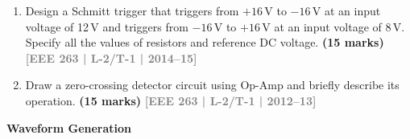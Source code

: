 \documentclass[12pt,a3paper]{article}
\newcommand{\yr}[1]{\hfill\textcolor{gray}{\small\textbf{[#1]}}}
\newcommand{\mk}[1]{\textcolor{orange!70!black}{\small\textbf{(#1 marks)}}}
\newcommand{\subtopic}[2]{%
  \vspace{10pt}
  \noindent\begin{tcolorbox}[colback=#1!8,colframe=#1,boxrule=0.6pt,arc=4pt,
    left=6pt,right=6pt,top=4pt,bottom=4pt]
    \small\bfseries\textcolor{#1}{#2}
  \end{tcolorbox}
  \vspace{2pt}
}
\begin{document}
\begin{enumerate}
\begin{center}
\end{center}
\mk{11} \yr{EEE 263 | L-2/T-1 | 2016--17}

\item Design a Schmitt trigger that triggers from $+16\,\text{V}$ to $-16\,\text{V}$ at an input voltage of 12\,V and triggers from $-16\,\text{V}$ to $+16\,\text{V}$ at an input voltage of 8\,V. Specify all the values of resistors and reference DC voltage.
\mk{15} \yr{EEE 263 | L-2/T-1 | 2014--15}

\item Draw a zero-crossing detector circuit using Op-Amp and briefly describe its operation.
\mk{15} \yr{EEE 263 | L-2/T-1 | 2012--13}

\end{enumerate}

\subtopic{cE}{Waveform Generation}
\label{sub:s7-wave}
\end{document}
